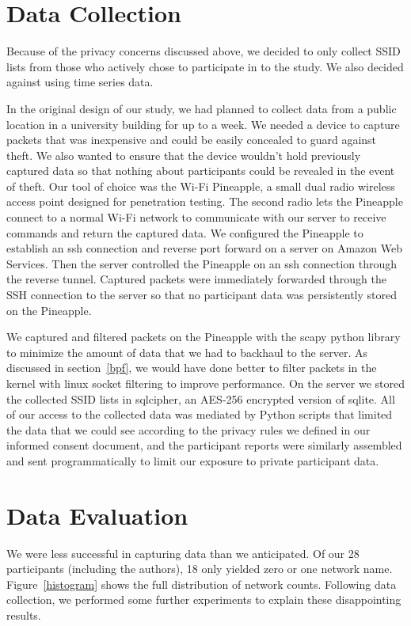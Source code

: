 \documentclass[letterpaper,twocolumn,10pt]{article}
\begin{document}
\section{Data Collection}
Because of the privacy concerns discussed above, we decided to only collect SSID lists from those who actively chose to participate in to the study. We also decided against using time series data.

In the original design of our study, we had planned to collect data from a public location in a university building for up to a week. We needed a device to capture packets that was inexpensive and could be easily concealed to guard against theft. We also wanted to ensure that the device wouldn't hold previously captured data so that nothing about participants could be revealed in the event of theft. Our tool of choice was the Wi-Fi Pineapple, a small dual radio wireless access point designed for penetration testing. The second radio lets the Pineapple connect to a normal Wi-Fi network to communicate with our server to receive commands and return the captured data. We configured the Pineapple to establish an ssh connection and reverse port forward on a server on Amazon Web Services. Then the server controlled the Pineapple on an ssh connection through the reverse tunnel. Captured packets were immediately forwarded through the SSH connection to the server so that no participant data was persistently stored on the Pineapple.

We captured and filtered packets on the Pineapple with the scapy python library to minimize the amount of data that we had to backhaul to the server. As discussed in section~\ref{bpf}, we would have done better to filter packets in the kernel with linux socket filtering to improve performance. On the server we stored the collected SSID lists in sqlcipher, an AES-256 encrypted version of sqlite. All of our access to the collected data was mediated by Python scripts that limited the data that we could see according to the privacy rules we defined in our informed consent document, and the participant reports were similarly assembled and sent programmatically to limit our exposure to private participant data.

\section{Data Evaluation}
We were less successful in capturing data than we anticipated. Of our 28 participants (including the authors), 18 only yielded zero or one network name. Figure~\ref{histogram} shows the full distribution of network counts. Following data collection, we performed some further experiments to explain these disappointing results.
\end{document}
